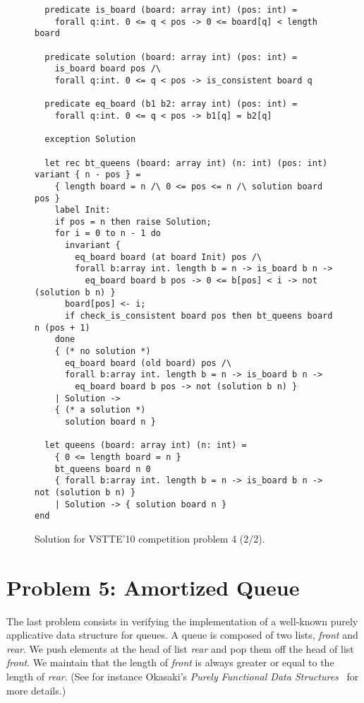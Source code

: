 \begin{figure}
  \centering
\begin{verbatim}
  predicate is_board (board: array int) (pos: int) =
    forall q:int. 0 <= q < pos -> 0 <= board[q] < length board

  predicate solution (board: array int) (pos: int) =
    is_board board pos /\
    forall q:int. 0 <= q < pos -> is_consistent board q

  predicate eq_board (b1 b2: array int) (pos: int) =
    forall q:int. 0 <= q < pos -> b1[q] = b2[q]

  exception Solution

  let rec bt_queens (board: array int) (n: int) (pos: int) variant { n - pos } =
    { length board = n /\ 0 <= pos <= n /\ solution board pos }
    label Init:
    if pos = n then raise Solution;
    for i = 0 to n - 1 do
      invariant {
        eq_board board (at board Init) pos /\
        forall b:array int. length b = n -> is_board b n ->
          eq_board board b pos -> 0 <= b[pos] < i -> not (solution b n) }
      board[pos] <- i;
      if check_is_consistent board pos then bt_queens board n (pos + 1)
    done
    { (* no solution *)
      eq_board board (old board) pos /\
      forall b:array int. length b = n -> is_board b n ->
        eq_board board b pos -> not (solution b n) }
    | Solution ->
    { (* a solution *)
      solution board n }

  let queens (board: array int) (n: int) =
    { 0 <= length board = n }
    bt_queens board n 0
    { forall b:array int. length b = n -> is_board b n -> not (solution b n) }
    | Solution -> { solution board n }
end
\end{verbatim}
\vspace*{-2em}\hrulefill
  \caption{Solution for VSTTE'10 competition problem 4 (2/2).}
  \label{fig:NQueens2}
\end{figure}


\section{Problem 5: Amortized Queue}

The last problem consists in verifying the implementation of a
well-known purely applicative data structure for queues.
A queue is composed of two lists, \textit{front} and \textit{rear}.
We push elements at the head of list \textit{rear} and pop them off
the head of list \textit{front}. We maintain that the length of
\textit{front} is always greater or equal to the length of \textit{rear}.
(See for instance Okasaki's \emph{Purely Functional Data
  Structures}~\cite{okasaki98} for more details.)

